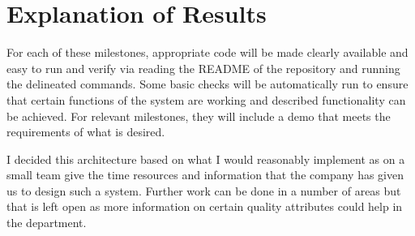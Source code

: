 \section{Explanation of Results}

For each of these milestones, appropriate code will be made clearly available and easy to run and verify via reading the README of the repository and running the delineated commands. Some basic checks will be automatically run to ensure that certain functions of the system are working and described functionality can be achieved. For relevant milestones, they will include a demo that meets the requirements of what is desired.

I decided this architecture based on what I would reasonably implement as on a small team give the time resources and information that the company has given us to design such a system. Further work can be done in a number of areas but that is left open as more information on certain quality attributes could help in the department.